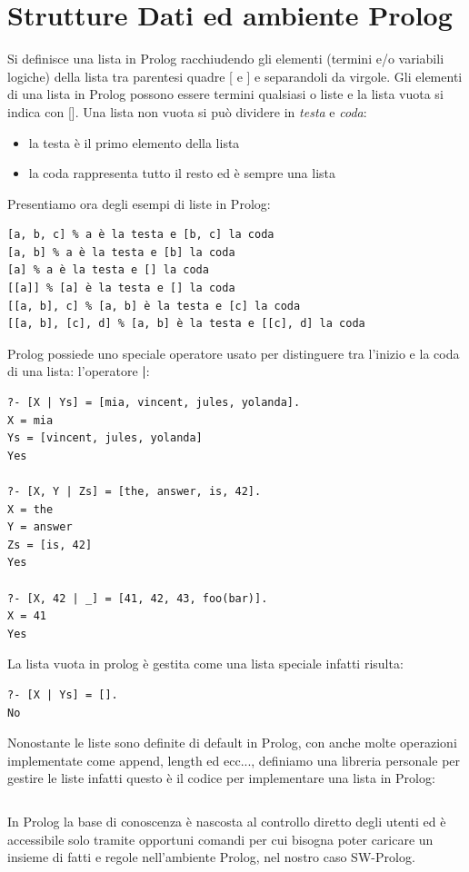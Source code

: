 \documentclass[a4paper]{book}
\begin{document}
\section{Strutture Dati ed ambiente Prolog}
Si definisce una lista in Prolog racchiudendo gli elementi (termini e/o variabili logiche) della lista tra parentesi quadre [ e ]
e separandoli da virgole.\newline
Gli elementi di una lista in Prolog possono essere termini qualsiasi o liste e la lista vuota si indica con [].\newline
Una lista non vuota si può dividere in \textit{testa} e \textit{coda}:
\begin{itemize}
\item la testa è il primo elemento della lista
\item la coda rappresenta tutto il resto ed è sempre una lista
\end{itemize}
Presentiamo ora degli esempi di liste in Prolog:
\begin{verbatim}
[a, b, c] % a è la testa e [b, c] la coda
[a, b] % a è la testa e [b] la coda
[a] % a è la testa e [] la coda
[[a]] % [a] è la testa e [] la coda
[[a, b], c] % [a, b] è la testa e [c] la coda
[[a, b], [c], d] % [a, b] è la testa e [[c], d] la coda
\end{verbatim}
Prolog possiede uno speciale operatore usato per distinguere tra l'inizio e la coda di una lista: l'operatore \textbf{|}:
\begin{verbatim}
?- [X | Ys] = [mia, vincent, jules, yolanda].
X = mia
Ys = [vincent, jules, yolanda]
Yes

?- [X, Y | Zs] = [the, answer, is, 42].
X = the
Y = answer
Zs = [is, 42]
Yes

?- [X, 42 | _] = [41, 42, 43, foo(bar)].
X = 41
Yes
\end{verbatim}
La lista vuota in prolog è gestita come una lista speciale infatti risulta:
\begin{verbatim}
?- [X | Ys] = [].
No
\end{verbatim}
Nonostante le liste sono definite di default in Prolog, con anche molte operazioni implementate come append, length ed ecc...,
definiamo una libreria personale per gestire le liste infatti questo è il codice per implementare una lista in Prolog:
\inputminted{Prolog}{esempi/liste.pl}
In Prolog la base di conoscenza è nascosta al controllo diretto degli utenti ed è accessibile solo tramite opportuni comandi per cui
bisogna poter caricare un insieme di fatti e regole nell'ambiente Prolog, nel nostro caso SW-Prolog.\newline
\end{document}
